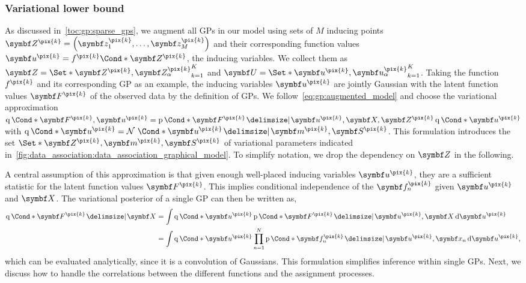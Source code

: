 \subsubsection{Variational lower bound}
As discussed in~\cref{toc:gp:sparse_gps}, we augment all GPs in our model using sets of $M$ inducing points $\mat{Z}^{\pix{k}} = \left(\mat{z}_1^{\pix{k}}, \ldots, \mat{z}_M^{\pix{k}}\right)$ and their corresponding function values $\mat{u}^{\pix{k}} = \Fun*{f^{\pix{k}}}{\mat{Z}^{\pix{k}}}$, the inducing variables.
We collect them as $\mat{Z} = \Set*{\mat{Z}^{\pix{k}}, \mat{Z}_\alpha^{\pix{k}}}_{k=1}^K$ and $\mat{U} = \Set*{\mat{u}^{\pix{k}}, \mat{u}_\alpha^{\pix{k}}}_{k=1}^K$.
Taking the function $f^{\pix{k}}$ and its corresponding GP as an example, the inducing variables $\mat{u}^{\pix{k}}$ are jointly Gaussian with the latent function values $\mat{F}^{\pix{k}}$ of the observed data by the definition of GPs.
We follow~\cref{eq:gp:augmented_model} and choose the variational approximation $\Variat*{\mat{F}^{\pix{k}}, \mat{u}^{\pix{k}}} = \Prob*{\mat{F}^{\pix{k}} \given \mat{u}^{\pix{k}}, \mat{X}, \mat{Z}^{\pix{k}}}\Variat*{\mat{u}^{\pix{k}}}$ with $\Variat*{\mat{u}^{\pix{k}}} = \Gaussian*{\mat{u}^{\pix{k}} \given \mat{m}^{\pix{k}}, \mat{S}^{\pix{k}}}$.
This formulation introduces the set $\Set*{\mat{Z}^{\pix{k}}, \mat{m}^{\pix{k}}, \mat{S}^{\pix{k}}}$ of variational parameters indicated in~\cref{fig:data_association:data_association_graphical_model}.
To simplify notation, we drop the dependency on $\mat{Z}$ in the following.

A central assumption of this approximation is that given enough well-placed inducing variables $\mat{u}^{\pix{k}}$, they are a sufficient statistic for the latent function values $\mat{F}^{\pix{k}}$.
This implies conditional independence of the $\mat{f}_n^{\pix{k}}$ given $\mat{u}^{\pix{k}}$ and $\mat{X}$.
The variational posterior of a single GP can then be written as,
\begin{align}
    \begin{split}
        \Variat*{\mat{F}^{\pix{k}} \given \mat{X}}
        &=
        \int \Variat*{\mat{u}^{\pix{k}}}
        \Prob*{\mat{F}^{\pix{k}} \given \mat{u}^{\pix{k}}, \mat{X}}
        \diff \mat{u}^{\pix{k}}
        \\
        &=
        \int \Variat*{\mat{u}^{\pix{k}}}
        \prod_{n=1}^N \Prob*{\mat{f}_n^{\pix{k}} \given \mat{u}^{\pix{k}}, \mat{x}_n}
        \diff \mat{u}^{\pix{k}},
    \end{split}
\end{align}
which can be evaluated analytically, since it is a convolution of Gaussians.
This formulation simplifies inference within single GPs.
Next, we discuss how to handle the correlations between the different functions and the assignment processes.

